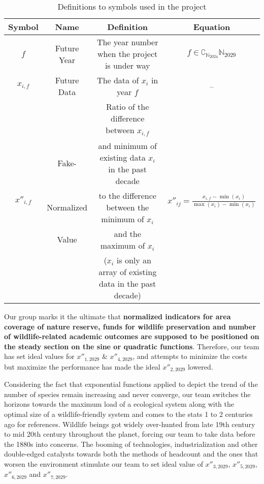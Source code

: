 \documentclass[12pt]{article}
\begin{document}
\begin{table}
	\begin{tabular}{cccc}
	\hline
		Symbol &Name & Definition & Equation\\
		\hline
		$f$ & Future Year & The year number when the project is under way & $f\in\complement_{\mathbb{N}_{2024}}\mathbb{N}_{2029}$\\
		\hline
		$x_{i,f}$ & Future Data & The data of $x_i$ in year $f$ & --\\
		\hline
		\multirow{5}{*}{$x''_{i,f}$} &  & Ratio of the difference between $x_{i,f}$ &\multirow{5}{*}{$x''_{ij}=\frac{x_{i,f}-\min(x_i)}{\max(x_i)-\min(x_i)}$}\\
		&Fake-&and minimum of existing data $x_i$ in the past decade\\
		&Normalized&to the difference between the minimum of $x_i$\\
		&Value&and the maximum of $x_i$\\
		&&($x_i$ is only an array of existing data in the past decade)\\
		\hline
	\end{tabular}
\caption{Definitions to symbols used in the project}
\end{table}

Our group marks it the ultimate that \textbf{normalized indicators for area coverage of nature reserve, funds for wildlife preservation and number of wildlife-related academic outcomes are supposed to be positioned on the steady section on the sine or quadratic functions}. Therefore, our team has set ideal values for $x''_{1,2029}$ \& $x''_{4,2029}$, and attempts to minimize the costs but maximize the performance has made the ideal $x''_{2, 2029}$ lowered.

Considering the fact that exponential functions applied to depict the trend of the number of species remain increasing and never converge, our team switches the horizons towards the maximum load of a ecological system along with the optimal size of a wildlife-friendly system and comes to the stats 1 to 2 centuries ago for references. Wildlife beings got widely over-hunted from late 19th century to mid 20th century throughout the planet, forcing our team to take data before the 1880s into concerns. The booming of technologies, industrialization and other double-edged catalysts towards both the methods of headcount and the ones that worsen the environment stimulate our team to set ideal value of $x''_{3,2029}$, $x''_{5,2029}$, $x''_{6,2029}$ and $x''_{7, 2029}$.
\end{document}
